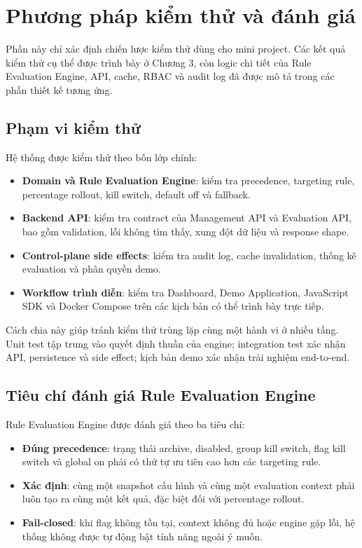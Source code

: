 \section{Phương pháp kiểm thử và đánh giá}

Phần này chỉ xác định chiến lược kiểm thử dùng cho mini project. Các kết quả kiểm thử cụ thể được trình bày ở Chương 3, còn logic chi tiết của Rule Evaluation Engine, API, cache, RBAC và audit log đã được mô tả trong các phần thiết kế tương ứng.

\subsection{Phạm vi kiểm thử}

Hệ thống được kiểm thử theo bốn lớp chính:

\begin{itemize}
    \item \textbf{Domain và Rule Evaluation Engine}: kiểm tra precedence, targeting rule, percentage rollout, kill switch, default off và fallback.
    \item \textbf{Backend API}: kiểm tra contract của Management API và Evaluation API, bao gồm validation, lỗi không tìm thấy, xung đột dữ liệu và response shape.
    \item \textbf{Control-plane side effects}: kiểm tra audit log, cache invalidation, thống kê evaluation và phân quyền demo.
    \item \textbf{Workflow trình diễn}: kiểm tra Dashboard, Demo Application, JavaScript SDK và Docker Compose trên các kịch bản có thể trình bày trực tiếp.
\end{itemize}

Cách chia này giúp tránh kiểm thử trùng lặp cùng một hành vi ở nhiều tầng. Unit test tập trung vào quyết định thuần của engine; integration test xác nhận API, persistence và side effect; kịch bản demo xác nhận trải nghiệm end-to-end.

\subsection{Tiêu chí đánh giá Rule Evaluation Engine}

Rule Evaluation Engine được đánh giá theo ba tiêu chí:

\begin{itemize}
    \item \textbf{Đúng precedence}: trạng thái archive, disabled, group kill switch, flag kill switch và global on phải có thứ tự ưu tiên cao hơn các targeting rule.
    \item \textbf{Xác định}: cùng một snapshot cấu hình và cùng một evaluation context phải luôn tạo ra cùng một kết quả, đặc biệt đối với percentage rollout.
    \item \textbf{Fail-closed}: khi flag không tồn tại, context không đủ hoặc engine gặp lỗi, hệ thống không được tự động bật tính năng ngoài ý muốn.
\end{itemize}


